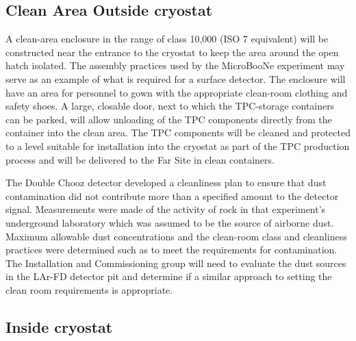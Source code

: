 \subsection{Clean Area Outside cryostat}
\label{fd:install:tempeqp:cleanarea}

A clean-area enclosure in the range of class 10,000 (ISO 7 equivalent) will be constructed near the entrance to the cryostat to keep the area around the open hatch isolated. The assembly practices used by 
the MicroBooNe experiment may serve as an example of what is required for a surface detector. The enclosure will have an area for personnel to gown with the appropriate clean-room clothing and safety 
shoes. A large, closable door, next to which the TPC-storage containers can be parked, will allow unloading of the TPC components directly from the container into the clean area. The TPC components 
will be cleaned and protected to a level suitable for installation into the cryostat as part of the TPC production process and will be delivered to the Far Site in clean containers. 

The Double Chooz detector developed a cleanliness plan to ensure that dust contamination did not contribute more than a specified amount to the detector signal. Measurements were made of the activity 
of rock in that experiment’s underground laboratory which was assumed to be the source of airborne dust. Maximum allowable dust concentrations and the clean-room class and cleanliness practices were 
determined such as to meet the requirements for contamination. The Installation and Commissioning group will need to evaluate the dust sources in the LAr-FD detector pit and determine if a similar 
approach to setting the clean room requirements is appropriate. 

\subsection{Inside cryostat}
\label{fd:install:tempeqp:inside}

